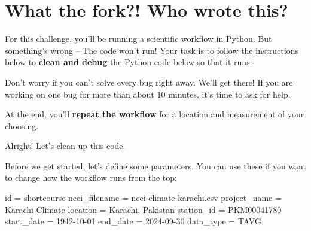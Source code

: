 \documentclass[
  letterpaper,
  DIV=11,
  numbers=noendperiod,
  oneside]{scrreprt}
\newenvironment{Shaded}{\begin{snugshade}}{\end{snugshade}}
\newcommand{\BuiltInTok}[1]{\textcolor[rgb]{0.00,0.23,0.31}{#1}}
\newcommand{\NormalTok}[1]{\textcolor[rgb]{0.00,0.23,0.31}{#1}}
\newcommand{\OperatorTok}[1]{\textcolor[rgb]{0.37,0.37,0.37}{#1}}
\newcommand{\StringTok}[1]{\textcolor[rgb]{0.13,0.47,0.30}{#1}}
\begin{document}
\section{What the fork?! Who wrote
this?}\label{what-the-fork-who-wrote-this}

For this challenge, you'll be running a scientific workflow in Python.
But something's wrong -- The code won't run! Your task is to follow the
instructions below to \textbf{clean and debug} the Python code below so
that it runs.

\begin{tcolorbox}[enhanced jigsaw, colbacktitle=quarto-callout-tip-color!10!white, opacityback=0, bottomtitle=1mm, toptitle=1mm, bottomrule=.15mm, left=2mm, colframe=quarto-callout-tip-color-frame, leftrule=.75mm, opacitybacktitle=0.6, colback=white, rightrule=.15mm, toprule=.15mm, breakable, titlerule=0mm, title=\textcolor{quarto-callout-tip-color}{\faLightbulb}\hspace{0.5em}{Tip}, coltitle=black, arc=.35mm]

Don't worry if you can't solve every bug right away. We'll get there! If
you are working on one bug for more than about 10 minutes, it's time to
ask for help.

\end{tcolorbox}

At the end, you'll \textbf{repeat the workflow} for a location and
measurement of your choosing.

Alright! Let's clean up this code.

Before we get started, let's define some parameters. You can use these
if you want to change how the workflow runs from the top:

\begin{Shaded}
\begin{Highlighting}[]
\BuiltInTok{id} \OperatorTok{=} \StringTok{\textquotesingle{}shortcourse\textquotesingle{}}
\NormalTok{ncei\_filename }\OperatorTok{=} \StringTok{\textquotesingle{}ncei{-}climate{-}karachi.csv\textquotesingle{}}
\NormalTok{project\_name }\OperatorTok{=} \StringTok{\textquotesingle{}Karachi Climate\textquotesingle{}}
\NormalTok{location }\OperatorTok{=} \StringTok{\textquotesingle{}Karachi, Pakistan\textquotesingle{}}
\NormalTok{station\_id }\OperatorTok{=} \StringTok{\textquotesingle{}PKM00041780\textquotesingle{}}
\NormalTok{start\_date }\OperatorTok{=} \StringTok{\textquotesingle{}1942{-}10{-}01\textquotesingle{}}
\NormalTok{end\_date }\OperatorTok{=} \StringTok{\textquotesingle{}2024{-}09{-}30\textquotesingle{}}
\NormalTok{data\_type }\OperatorTok{=} \StringTok{\textquotesingle{}TAVG\textquotesingle{}}
\end{Highlighting}
\end{Shaded}
\end{document}
